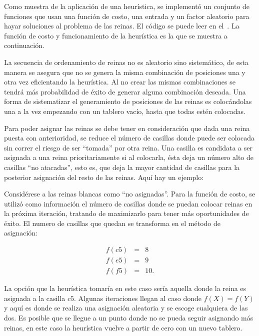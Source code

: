 Como muestra de la aplicación de una heurística, se implementó un conjunto de
funciones que usan una función de costo, una entrada y un factor aleatorio para
hayar soluciones al problema de las reinas. El código se puede leer
en el~. La función de costo y funcionamiento de la
heurística es la que se muestra a continuación.

La secuencia de ordenamiento de reinas no es aleatorio sino sistemático, de
esta manera se asegura que no se genera la misma combinación de posiciones una
y otra vez eficientando la heurística. Al no crear las mismas combinaciones
se tendrá más probabilidad de éxito de generar alguna combinación deseada.
Una forma de sistematizar el generamiento de posiciones de las reinas es
colocándolas una a la vez empezando con un tablero vacío, hasta que todas
estén colocadas.

Para poder asignar las reinas se debe tener en consideración que dada una reina
puesta con anterioridad, se reduce el número de casillas donde puede ser colocada
sin correr el riesgo de ser ``tomada'' por otra reina. Una casilla es candidata
a ser asignada a una reina prioritariamente si al colocarla, ésta deja un número
alto de casillas ``no atacadas'', esto es, que deja la mayor cantidad de
casillas para la posterior asignación del resto de las reinas. Aquí hay un
ejemplo:



Considérese a las reinas blancas como ``no asignadas''. Para la función de
costo, se utilizó como información el número de casillas donde se puedan colocar
reinas en la próxima iteración, tratando de maximizarlo para tener más
oportunidades de éxito. El numero de casillas que quedan se transforma en
el método de asignación:

\begin{displaymath}
  \begin{array}{rcl}
    f(c5) & = & 8 \\
    f(e5) & = & 9 \\
    f(f5) & = & 10.
  \end{array}
\end{displaymath}

La opción que la heurística tomaría en este caso sería aquella donde la reina
es asignada a la casilla $c5$. Algunas iteraciones llegan al caso donde
$f(X) = f(Y)$ y aquí es donde se realiza una asignación aleatoria y se escoge
cualquiera de las dos. Es posible que se llegue a un punto donde no se pueda
seguir asignando más reinas, en este caso la heurística vuelve a partir de cero
con un nuevo tablero.


